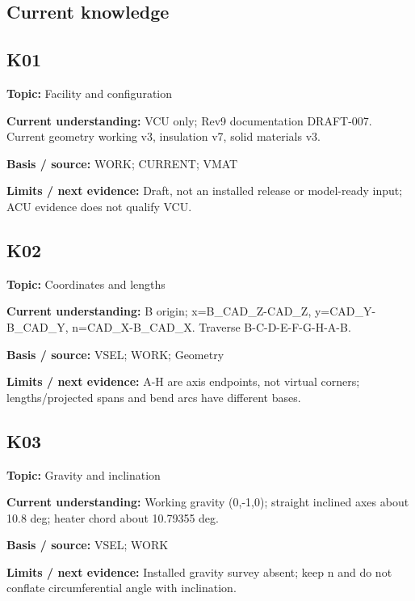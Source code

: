\documentclass[11pt]{article}
\begin{document}
\subsection{Current knowledge}
\par\noindent\begin{minipage}{\textwidth}\small\setlength{\parskip}{2pt}
\subsection*{K01}
\textbf{Topic:} Facility and configuration\par
\textbf{Current understanding:} VCU only; Rev9 documentation DRAFT-007. Current geometry working v3, insulation v7, solid materials v3.\par
\textbf{Basis / source:} WORK; CURRENT; VMAT\par
\textbf{Limits / next evidence:} Draft, not an installed release or model-ready input; ACU evidence does not qualify VCU.\par
\end{minipage}\par\vspace{5pt}
\par\noindent\begin{minipage}{\textwidth}\small\setlength{\parskip}{2pt}
\subsection*{K02}
\textbf{Topic:} Coordinates and lengths\par
\textbf{Current understanding:} B origin; x=B\_\allowbreak{}CAD\_\allowbreak{}Z-CAD\_\allowbreak{}Z, y=CAD\_\allowbreak{}Y-B\_\allowbreak{}CAD\_\allowbreak{}Y, n=CAD\_\allowbreak{}X-B\_\allowbreak{}CAD\_\allowbreak{}X. Traverse B-C-D-E-F-G-H-A-B.\par
\textbf{Basis / source:} VSEL; WORK; Geometry\par
\textbf{Limits / next evidence:} A-H are axis endpoints, not virtual corners; lengths/projected spans and bend arcs have different bases.\par
\end{minipage}\par\vspace{5pt}
\par\noindent\begin{minipage}{\textwidth}\small\setlength{\parskip}{2pt}
\subsection*{K03}
\textbf{Topic:} Gravity and inclination\par
\textbf{Current understanding:} Working gravity (0,-1,0); straight inclined axes about 10.8 deg; heater chord about 10.79355 deg.\par
\textbf{Basis / source:} VSEL; WORK\par
\textbf{Limits / next evidence:} Installed gravity survey absent; keep n and do not conflate circumferential angle with inclination.\par
\end{minipage}\par\vspace{5pt}
\end{document}
